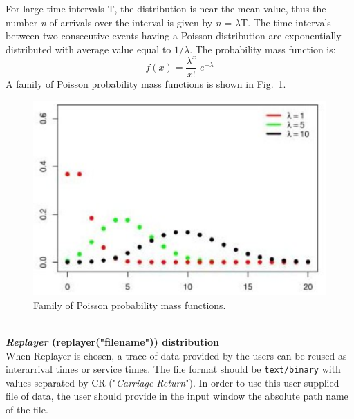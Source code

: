 For large time intervals T, the distribution is near the mean
value, thus the number \emph{n} of arrivals over the interval is
given by \emph{n} = $\lambda$T. The time intervals between two
consecutive events having a Poisson distribution are exponentially
distributed with average value equal to $1/\lambda$. The
probability mass function is:
\[ f(x) = \frac{\lambda^x}{x!} \; e^{-\lambda}
\]
A family of Poisson probability mass functions is shown in
Fig.~\ref{fig:famPois}.
\begin{figure}[htb]
    \begin{center}
        \includegraphics[scale=.5]{img/jsimg/4.11.eps}
    \end{center}
    \caption{Family of Poisson probability mass functions.}
    \label{fig:famPois}
\end{figure}\\

\textbf{\emph{Replayer} (replayer("filename")) distribution}\\
When Replayer is chosen, a trace of data provided by the users can
be reused as interarrival times or service times. The file format
should be \texttt{text/binary} with values separated by CR
("\emph{Carriage Return}"). In order to use this user-supplied
file of data, the user should provide in the input window the
absolute path name of the file.\\

